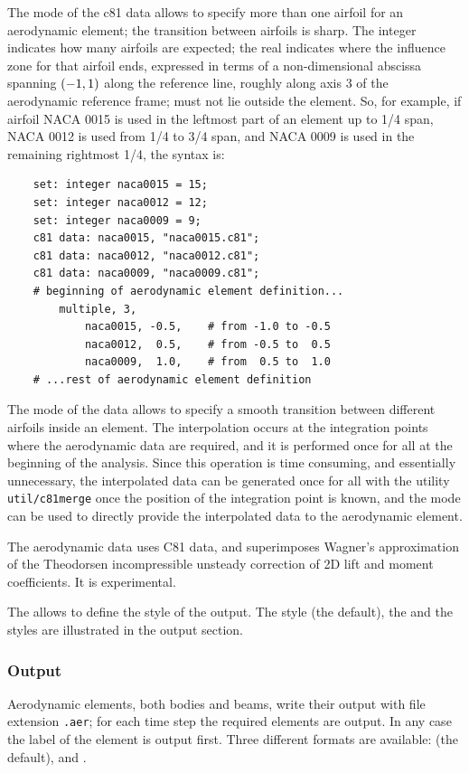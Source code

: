 The  mode of the c81 data allows to specify
more than one airfoil for an aerodynamic element; the transition
between airfoils is sharp.
The integer  indicates how many airfoils are expected;
the real  indicates where the influence zone for that
airfoil ends, expressed in terms of a non-dimensional abscissa spanning 
$\left( -1,1 \right)$ along the reference line, roughly along axis 3 
of the aerodynamic reference frame;  must not lie outside
the element.
So, for example, if airfoil NACA 0015 is used in the leftmost part
of an element up to 1/4 span, NACA 0012 is used from 1/4 to 3/4 span,
and NACA 0009 is used in the remaining rightmost 1/4, the syntax is:
\begin{verbatim}
    set: integer naca0015 = 15;
    set: integer naca0012 = 12;
    set: integer naca0009 = 9;
    c81 data: naca0015, "naca0015.c81";
    c81 data: naca0012, "naca0012.c81";
    c81 data: naca0009, "naca0009.c81";
    # beginning of aerodynamic element definition...
        multiple, 3,
            naca0015, -0.5,    # from -1.0 to -0.5
            naca0012,  0.5,    # from -0.5 to  0.5
            naca0009,  1.0,    # from  0.5 to  1.0
    # ...rest of aerodynamic element definition
\end{verbatim}

The  mode of the  data allows to specify 
a smooth transition between different airfoils inside an element.
The interpolation occurs at the integration points where the
aerodynamic data are required, and it is performed once for all
at the beginning of the analysis.
Since this operation is time consuming, and essentially unnecessary,
the interpolated data can be generated once for all with the utility
\texttt{util/c81merge} once the position of the integration point is known,
and the  mode can be used to directly provide
the interpolated data to the aerodynamic element.

The  aerodynamic data uses C81 data,
and superimposes Wagner's approximation of the Theodorsen incompressible
unsteady correction of 2D lift and moment coefficients.
It is experimental.

The  allows to define the style of the output.
The  style (the default), the  and the 
styles are illustrated in the output section.


\subsubsection{Output}
Aerodynamic elements, both bodies and beams, write their output with file
extension \texttt{.aer}; for each time step the required elements are output.
In any case the label of the element is output first.
Three different formats are available:  (the default),
 and .


